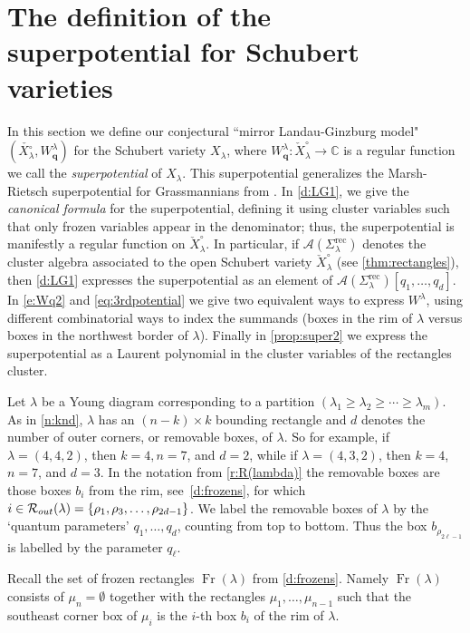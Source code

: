 \documentclass{amsart}
\theoremstyle{definition}
\numberwithin{equation}{section}
\newcommand{\rect}{\mathrm{rec}}
\newcommand{\Rout}{\mathcal R_{\rm{out}}}
\newcommand{\C}{\mathbb{C}}
\newcommand{\Fr}{\operatorname{Fr}}
\newcommand{\dualSchub}{\check{X}_{\lambda}}
\begin{document}
\section{The definition of the superpotential for Schubert varieties}
\label{s:superpotential}

In this section we define our 
conjectural 
``mirror Landau-Ginzburg model" 
$(\check{X_{\lambda}^{\circ}}, 
W^{\lambda}_{\mathbf q})$  for the Schubert variety $X_\lambda$, where  
$W^{\lambda}_{\mathbf q}:
\dualSchub^{\circ} 
\to\C$ is a regular function 
we call the {\it superpotential} of $X_\lambda$.  
This superpotential generalizes the 
Marsh-Rietsch superpotential for Grassmannians from \cite{MR-Adv}. 
In \cref{d:LG1}, we give the \emph{canonical formula} for the 
superpotential, defining it using cluster variables such that 
only frozen variables appear in the denominator; thus, the 
superpotential is manifestly
 a regular function on $\dualSchub^{\circ}$.  In particular, 
if $\mathcal{A}(\Sigma_{\lambda}^{\rect})$ 
denotes the 
cluster algebra associated to the open Schubert variety
$\dualSchub^{\circ}$ (see \cref{thm:rectangles}), then 
\cref{d:LG1}
 expresses the superpotential as an element
of $\mathcal{A}(\Sigma_{\lambda}^{\rect})[q_1,\dots,q_d]$.
In \cref{e:Wq2} and 
 \cref{eq:3rdpotential} we give two equivalent ways to 
 express $W^{\lambda}$, using different combinatorial ways to index
 the summands (boxes in the rim of $\lambda$ versus boxes
 in the northwest border of $\lambda$).
Finally in \cref{prop:super2} we express the superpotential
as a Laurent polynomial in the cluster variables of the rectangles 
cluster.


Let $\lambda$ be a Young diagram 
corresponding to a partition $(\lambda_1\ge\lambda_2\ge\cdots\ge\lambda_{m})$. As in \cref{n:knd}, $\lambda$ has an $(n-k)\times k$ bounding rectangle and $d$ denotes the number of outer corners, or 
removable boxes, of $\lambda$.
So for example, 
if $\lambda = (4,4,2)$, then $k=4, n=7$, and $d=2$, while 
if $\lambda = (4,3,2)$, then $k=4$, $n=7$, and $d=3$.
In the notation from \cref{r:R(lambda)} the removable boxes are those boxes $b_i$ from the rim, see~\cref{d:frozens}, for which 
$i\in\Rout(\lambda)=\{\rho_1,\rho_3,\dotsc,\rho_{2d-1}\}$. 
We label the removable boxes of $\lambda$  
by the `quantum parameters' $q_1,\dotsc, q_d$, counting from top to bottom.
Thus the box $b_{\rho_{2\ell-1}}$ is labelled by the parameter $q_\ell$. 

Recall the set of frozen rectangles $\Fr(\lambda)$ from \cref{d:frozens}.
Namely $\Fr(\lambda)$ consists of $\mu_n=\emptyset$  together with the rectangles $\mu_1,\dotsc, \mu_{n-1}$ such that the southeast corner box of $\mu_i$ is the $i$-th box $b_i$ of the rim of $\lambda$. 
\end{document}
